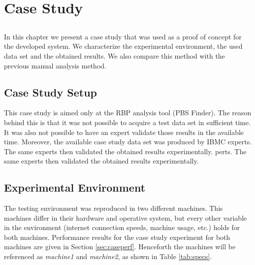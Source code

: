 \chapter{Case Study} \label{chap:casestudy}

\section*{}

In this chapter we present a case study that was used as a proof of concept for
the developed system. We characterize the experimental environment, the used
data set and the obtained results. We also compare this method with the previous
manual analysis method.

\section{Case Study Setup}

This case study is aimed only at the RBP analysis tool (PBS Finder). The reason
behind this is that it was not possible to acquire a test data set in sufficient
time. It was also not possible to have an expert validate those results in the
available time. Moreover, the available case study data set was produced by IBMC
experts. The same experts then validated the obtained results experimentally.
perts. The same experts then validated the obtained results experimentally.

\section{Experimental Environment}

The testing environment was reproduced in two different machines. This machines
differ in their hardware and operative system, but every other variable in the
environment (internet connection speeds, machine usage, etc.) holds for both
machines. Performance results for the case study experiment for both machines
are given in Section \ref{sec:caseperf}. Henceforth the machines will be
referenced as \emph{machine1} and \emph{machine2}, as shown in Table
\ref{tab:specs}.

